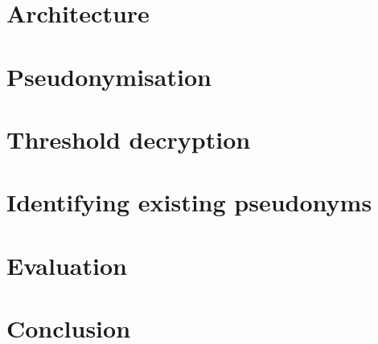 \documentclass[t]{beamer}
\begin{document}
  \begin{frame}
  
  \end{frame}

\section{Architecture}

\section{Pseudonymisation}

\section{Threshold decryption}

\section{Identifying existing pseudonyms}

\section{Evaluation}

\section{Conclusion}
\end{document}
